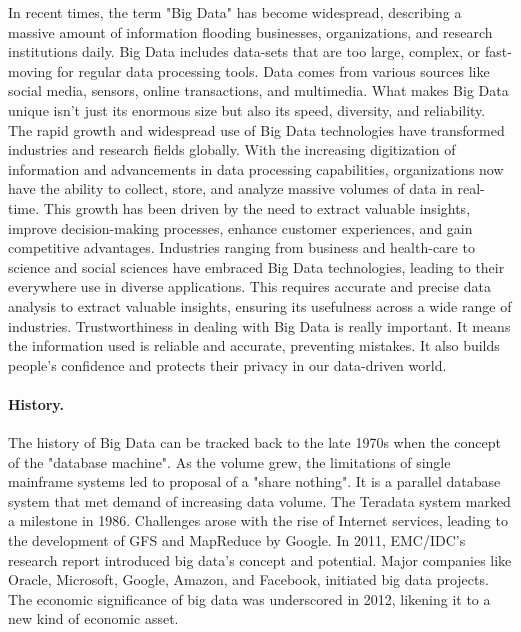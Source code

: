 \documentclass[10pt,a4paper]{article}
\begin{document}
In recent times, the term "Big Data" has become widespread, describing a massive amount of information flooding businesses, organizations, and research institutions daily. Big Data includes data-sets that are too large, complex, or fast-moving for regular data processing tools.\cite{mittal2013trustworthiness} Data comes from various sources like social media, sensors, online transactions, and multimedia. What makes Big Data unique isn't just its enormous size but also its speed, diversity, and reliability.\cite{gudivada2015big}
The rapid growth and widespread use of Big Data technologies have transformed industries and research fields globally. With the increasing digitization of information and advancements in data processing capabilities, organizations now have the ability to collect, store, and analyze massive volumes of data in real-time. This growth has been driven by the need to extract valuable insights, improve decision-making processes, enhance customer experiences, and gain competitive advantages.\cite{fanelli2023big} Industries ranging from business and health-care to science and social sciences have embraced Big Data technologies, leading to their everywhere use in diverse applications.\cite{anisetti2023assurance}
This requires accurate and precise data analysis to extract valuable insights, ensuring its usefulness across a wide range of industries. Trustworthiness in dealing with Big Data is really important. It means the information used is reliable and accurate, preventing mistakes. It also builds people's confidence and protects their privacy in our data-driven world.\cite{anisetti2023assurance}
\paragraph{History.}
The history of Big Data can be tracked back to the late 1970s when the concept of the "database machine". As the volume grew, the limitations of single mainframe systems led to proposal of a "share nothing". It is a parallel database system that met demand of increasing data volume. The Teradata system marked a milestone in 1986.\cite{chen2014big}  Challenges arose with the rise of Internet services, leading to the development of GFS and MapReduce by Google. In 2011, EMC/IDC's research report introduced big data's concept and potential. Major companies like Oracle, Microsoft, Google, Amazon, and Facebook, initiated big data projects.\cite{chen2014big} The economic significance of big data was underscored in 2012, likening it to a new kind of economic asset.
\cite{chen2014big} 
\end{document}

